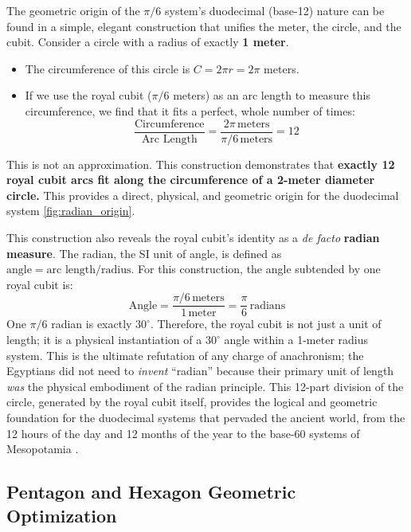 \documentclass[11pt]{article}
\begin{document}
The geometric origin of the $\pi/6$ system's duodecimal (base-12) nature can be found in a simple, elegant construction that unifies the meter, the circle, and the cubit. Consider a circle with a radius of exactly \textbf{1 meter}.
\begin{itemize}
    \item The circumference of this circle is $C = 2\pi r = 2\pi$ meters.
    \item If we use the royal cubit ($\pi/6$ meters) as an arc length to measure this circumference, we find that it fits a perfect, whole number of times:
    \[
    \frac{\text{Circumference}}{\text{Arc Length}} = \frac{2\pi\,\text{meters}}{\pi/6\,\text{meters}} = 12
    \]
\end{itemize}
This is not an approximation. This construction demonstrates that \textbf{exactly 12 royal cubit arcs fit along the circumference of a 2-meter diameter circle.} This provides a direct, physical, and geometric origin for the duodecimal system \ref{fig:radian_origin}.

This construction also reveals the royal cubit's identity as a \textit{de facto} \textbf{radian measure}. The radian, the SI unit of angle, is defined as $\text{angle} = \text{arc length} / \text{radius}$. For this construction, the angle subtended by one royal cubit is:
\[
\text{Angle} = \frac{\pi/6\,\text{meters}}{1\,\text{meter}} = \frac{\pi}{6}\,\text{radians}
\]
One $\pi/6$ radian is exactly \textbf{$30^\circ$}. Therefore, the royal cubit is not just a unit of length; it is a physical instantiation of a $30^\circ$ angle within a 1-meter radius system. This is the ultimate refutation of any charge of anachronism; the Egyptians did not need to \textit{invent} ``radian'' because their primary unit of length \textit{was} the physical embodiment of the radian principle. This 12-part division of the circle, generated by the royal cubit itself, provides the logical and geometric foundation for the duodecimal systems that pervaded the ancient world, from the 12 hours of the day and 12 months of the year to the base-60 systems of Mesopotamia \cite{neugebauer1969exact}.


\subsection{Pentagon and Hexagon Geometric Optimization}
\end{document}
